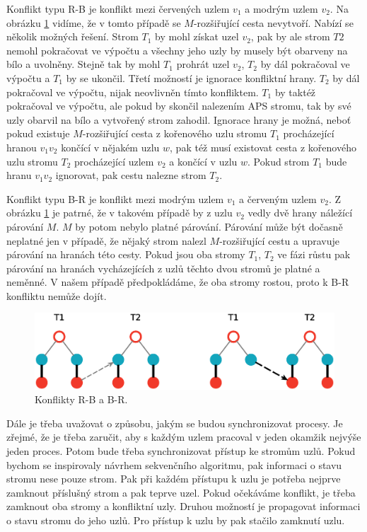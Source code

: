 \documentclass[a4paper, 11pt, titlepage, final]{article}[3. prosinec 2011]
\begin{document}
Konflikt typu R-B je konflikt mezi červených uzlem $v_1$ a modrým uzlem $v_2$. Na obrázku \ref{imgXY} vidíme, že v tomto případě se $M$-rozšiřující cesta nevytvoří. Nabízí se několik možných řešení. Strom $T_1$ by mohl získat uzel $v_2$, pak by ale strom $T2$ nemohl pokračovat ve výpočtu a všechny jeho uzly by musely být obarveny na bílo a uvolněny. Stejně tak by mohl $T_1$ prohrát uzel $v_2$, $T_2$ by dál pokračoval ve výpočtu a $T_1$ by se ukončil. Třetí možností je ignorace konfliktní hrany. $T_2$ by dál pokračoval ve výpočtu, nijak neovlivněn tímto konfliktem. $T_1$ by taktéž pokračoval ve výpočtu, ale pokud by skončil nalezením APS stromu, tak by své uzly obarvil na bílo a vytvořený strom zahodil. Ignorace hrany je možná, neboť pokud existuje $M$-rozšiřující cesta z kořenového uzlu stromu $T_1$ procházející hranou $v_1 v_2$ končící v nějakém uzlu $w$, pak též musí existovat cesta z kořenového uzlu stromu $T_2$ procházející uzlem $v_2$ a končící v uzlu $w$. Pokud strom $T_1$ bude hranu $v_1 v_2$ ignorovat, pak cestu nalezne strom $T_2$.

Konflikt typu B-R je konflikt mezi modrým uzlem $v_1$ a červeným uzlem $v_2$. Z obrázku \ref{imgXY} je patrné, že v takovém případě by z uzlu $v_2$ vedly dvě hrany náležící párování $M$. $M$ by potom nebylo platné párování. Párování může být dočasně neplatné jen v případě, že nějaký strom nalezl $M$-rozšiřující cestu a upravuje párování na hranách této cesty. Pokud jsou oba stromy $T_1$, $T_2$ ve fázi růstu pak párování na hranách vycházejících z uzlů těchto dvou stromů je platné a neměnné. V našem případě předpokládáme, že oba stromy rostou, proto k B-R konfliktu nemůže dojít.

\begin{figure}[ht]
  \centering
  \includegraphics[scale=0.5]{img/XYconflicts.eps}
  \caption{Konflikty R-B a B-R.}
  \label{imgXY}
\end{figure}

Dále je třeba uvažovat o způsobu, jakým se budou synchronizovat procesy. Je zřejmé, že je třeba zaručit, aby s každým uzlem pracoval v jeden okamžik nejvýše jeden proces. Potom bude třeba synchronizovat přístup ke stromům uzlů. Pokud bychom se inspirovaly návrhem sekvenčního algoritmu, pak informaci o stavu stromu nese pouze strom. Pak při každém přístupu k uzlu je potřeba nejprve zamknout příslušný strom a pak teprve uzel. Pokud očekáváme konflikt, je třeba zamknout oba stromy a konfliktní uzly. Druhou možností je propagovat informaci o stavu stromu do jeho uzlů. Pro přístup k uzlu by pak stačilo zamknutí uzlu.
\end{document}
